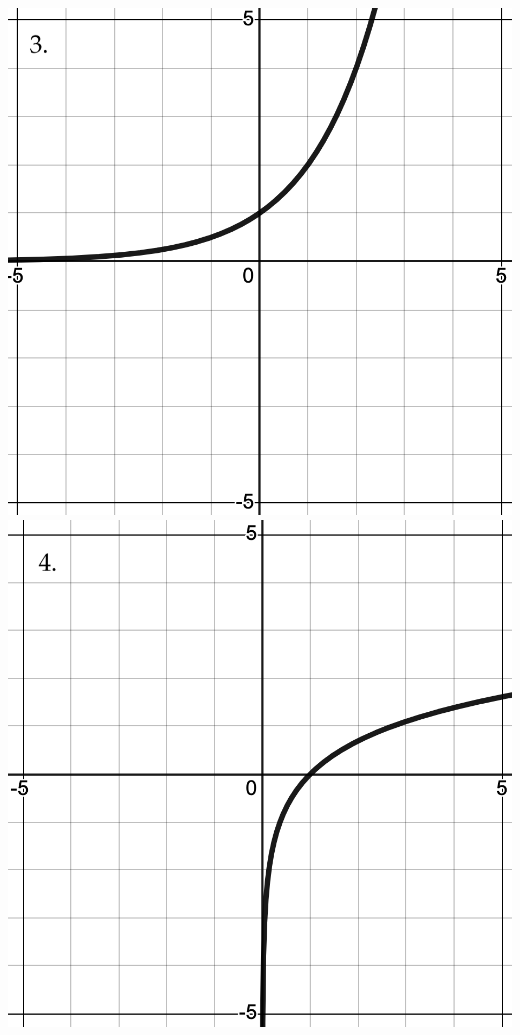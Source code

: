 \documentclass[12pt]{article}
\begin{document}
\begin{enumerate}
\begin{minipage}{0.7\textwidth}
\includegraphics [scale=.15]{3_2_0_ga}
\includegraphics [scale=.15]{3_2_0_gc}
\end{minipage}%
\hspace{5mm}
\begin{minipage}{0.6\textwidth}


\end{minipage}
\end{enumerate}
\end{document}
